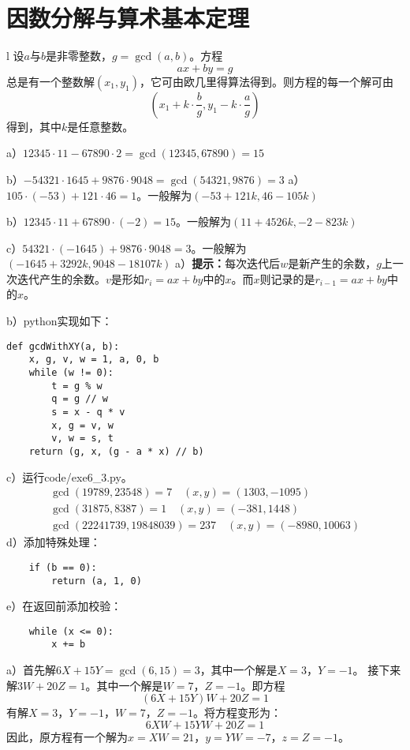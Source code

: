 \chapter{因数分解与算术基本定理}
\begin{theorem}[线性方程定理]{l}
设$a$与$b$是非零整数，$g=\gcd(a,b)$。方程
\[ax+by=g\]
总是有一个整数解$(x_1, y_1)$，它可由欧几里得算法得到。则方程的每一个解可由
\[\left(x_1+k\cdot\frac{b}{g}, y_1-k\cdot\frac{a}{g}\right)\]
得到，其中$k$是任意整数。
\end{theorem}
%
\exercise a）$12345\cdot 11 - 67890\cdot 2=\gcd(12345, 67890) = 15$\par
b）$-54321\cdot 1645 + 9876\cdot 9048 = \gcd(54321, 9876) = 3$
%
\exercise 
a）$105\cdot(-53)+121\cdot46=1$。一般解为$(-53+121k, 46-105k)$\par
b）$12345\cdot11+67890\cdot(-2)=15$。一般解为$(11+4526k, -2-823k)$\par
c）$54321\cdot(-1645)+9876\cdot9048=3$。一般解为$(-1645+3292k, 9048-18107k)$
%
\exercise 
a）{\bf 提示：}每次迭代后$w$是新产生的余数，$g$上一次迭代产生的余数。$v$是形如$r_i = ax + by$中的$x$。而$x$则记录的是$r_{i-1} = ax + by$中的$x$。\par
b）python实现如下：
\begin{lstlisting}
def gcdWithXY(a, b):
    x, g, v, w = 1, a, 0, b
    while (w != 0):
        t = g % w
        q = g // w
        s = x - q * v
        x, g = v, w
        v, w = s, t
    return (g, x, (g - a * x) // b)
\end{lstlisting}
c）运行code/exe6\_3.py。
\begin{gather*}
\gcd(19789, 23548) = 7\quad (x,y)=(1303,-1095) \\
\gcd(31875, 8387) = 1\quad (x,y)=(-381,1448) \\
\gcd(22241739, 19848039) = 237\quad (x,y)=(-8980,10063)
\end{gather*}
d）添加特殊处理：
\begin{lstlisting}
    if (b == 0):
        return (a, 1, 0)
\end{lstlisting}
e）在返回前添加校验：
\begin{lstlisting}
    while (x <= 0):
        x += b
\end{lstlisting}
%
\exercise a）首先解$6X+15Y=\gcd(6, 15)=3$，其中一个解是$X=3$，$Y=-1$。
接下来解$3W+20Z=1$。其中一个解是$W=7$，$Z=-1$。即方程
\[(6X+15Y)W + 20Z = 1\]
有解$X=3$，$Y=-1$，$W=7$，$Z=-1$。将方程变形为：
\[6XW+15YW + 20Z = 1\]
因此，原方程有一个解为$x=XW=21$，$y=YW=-7$，$z = Z=-1$。\par
